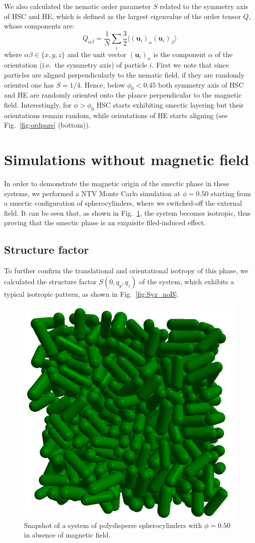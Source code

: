 \documentclass[aip,graphicx]{revtex4-1} %
\begin{document}
We also calculated the nematic order parameter $S$ related to the symmetry axis of HSC and HE, which
is defined as the largest eigenvalue of the order tensor $Q$, whose components are:
\begin{equation}
  Q_{\alpha\beta} = \frac{1}{N} \sum_i \frac{3}{2} \langle {(\mathbf{u}_i)}_\alpha {(\mathbf{u}_i)}_\beta\rangle
\label{eq:nemop}
\end{equation}
where $\alpha\beta\in\{x,y,z\}$ and the unit vector ${(\mathbf{u}_i)}_\alpha$ is the component $\alpha$ of the orientation (i.e.~the symmetry axis) of particle $i$.
First we note that since particles are aligned perpendicularly to the nematic field, if they are 
randomly oriented one has $S=1/4$. Hence, below $\phi_0 < 0.45$ both symmetry axis of HSC and HE are 
randomly oriented onto the plance perpendicular to the magnetic field.
Interestingly, for $\phi > \phi_0$ HSC starts exhibiting smectic layering but their orientations
remain random, while orientations of HE starts aligning (see Fig.~\ref{fig:ordpars} (bottom)).


\section{Simulations without magnetic field}

In order to demonstrate the magnetic origin of the smectic phase in these systems, we performed a NTV Monte Carlo simulation at $\phi=0.50$ starting from a smectic configuration  
of spherocylinders, where we switched-off the external field. 
It can be seen that, as shown in Fig.~\ref{fig:noB_snapshot}, the system becomes isotropic, thus proving that the smectic phase is an exquisite filed-induced effect.

\subsection{Structure factor}
To further confirm the translational and orientational isotropy of this phase, 
we calculated the structure factor $S(0, q_y, q_z)$ of the system, which exhibits a typical isotropic pattern, as shown in Fig.~\ref{fig:Syz_noB}.


\begin{figure}
    \centering
    \includegraphics[width=0.4\columnwidth]{Isotropic_phase_snap.png}
    \caption{Snapshot of a system of polydisperse spherocylinders with $\phi = 0.50$ in absence of magnetic field.}\label{fig:noB_snapshot}
\end{figure}
\end{document}
